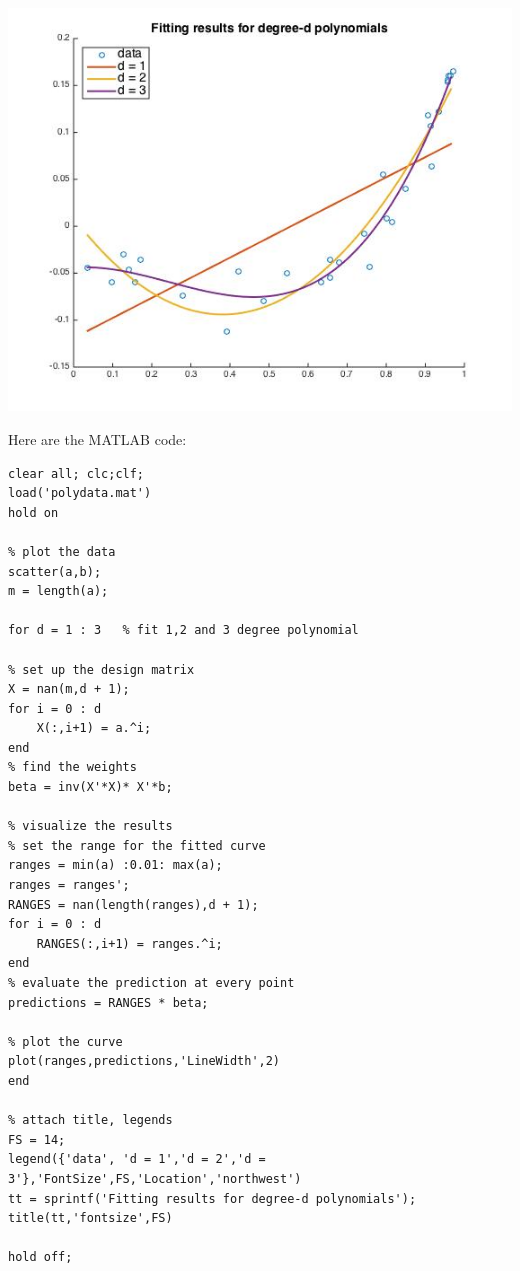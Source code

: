 \documentclass[paper=a4, fontsize=11pt]{scrartcl} %
\numberwithin{equation}{section} %
\numberwithin{figure}{section} %
\numberwithin{table}{section} %
\begin{document}
\includegraphics[scale=.8]{polyfit_hw2_3.jpg}

\newpage
Here are the MATLAB code: 
\begin{lstlisting} 
clear all; clc;clf;
load('polydata.mat')
hold on 

% plot the data
scatter(a,b);
m = length(a);

for d = 1 : 3   % fit 1,2 and 3 degree polynomial

% set up the design matrix
X = nan(m,d + 1);
for i = 0 : d 
	X(:,i+1) = a.^i;
end
% find the weights
beta = inv(X'*X)* X'*b;

% visualize the results
% set the range for the fitted curve
ranges = min(a) :0.01: max(a);
ranges = ranges';
RANGES = nan(length(ranges),d + 1);
for i = 0 : d 
	RANGES(:,i+1) = ranges.^i;
end
% evaluate the prediction at every point
predictions = RANGES * beta;

% plot the curve
plot(ranges,predictions,'LineWidth',2)
end

% attach title, legends
FS = 14; 
legend({'data', 'd = 1','d = 2','d = 3'},'FontSize',FS,'Location','northwest')
tt = sprintf('Fitting results for degree-d polynomials');
title(tt,'fontsize',FS)

hold off; 
\end{lstlisting} 



\newpage
\end{document}
